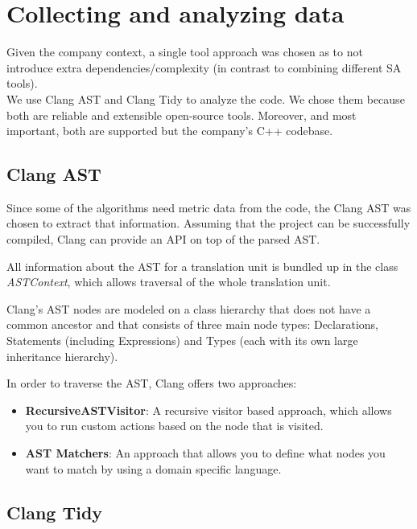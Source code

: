 
\section{Collecting and analyzing data}\label{sec:data}

Given the company context, a single tool approach was chosen as to not introduce extra dependencies/complexity (in contrast to combining different SA tools).\\
We use Clang AST \cite{clang_ast} and Clang Tidy \cite{clang_tidy} to analyze the code. We chose them because both are reliable and extensible open-source tools. Moreover, and most important, both are supported but the company's C++ codebase.



\subsection{Clang AST}
Since some of the algorithms need metric data from the code, the Clang AST was chosen to extract that information. Assuming that the project can be successfully compiled, Clang can provide an API on top of the parsed AST.  

All information about the AST for a translation unit is bundled up in the class \textit{ASTContext}, which allows traversal of the whole translation unit.

Clang’s AST nodes are modeled on a class hierarchy that does not have a common ancestor and that consists of three main node types: Declarations, Statements (including Expressions) and Types (each with its own large inheritance hierarchy).

In order to traverse the AST, Clang offers two approaches:
\begin{itemize}
	\item \textbf{RecursiveASTVisitor}: A recursive visitor based approach, which allows you to run custom actions based on the node that is visited.
	\item \textbf{AST Matchers}: An approach that allows you to define what nodes you want to match by using a domain specific language.
\end{itemize}

\subsection{Clang Tidy}

